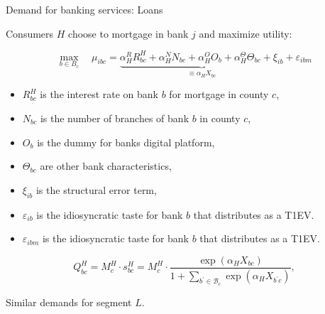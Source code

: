\documentclass[notes,10pt, aspectratio=169]{beamer}
\newenvironment{wideitemize}{\itemize\addtolength{\itemsep}{10pt}}{\enditemize}
\begin{document}
    \begin{frame}{ Demand for banking services: Loans}

        \begin{wideitemize}
    
            \item Consumers $H$ choose to mortgage in bank $j$  and maximize utility:
            
            $$
            \max _{b \in B_c} \quad \mu_{i b c}=\underbrace{\alpha_H^R R_{b c}^H+\alpha_H^N N_{b c}+\alpha_H^O O_b+\alpha_H^{\Theta} \Theta_{b c}+\xi_{i b}}_{\equiv \alpha_H X_{b c}}+\varepsilon_{i b m}
            $$
    
            \begin{itemize}
                \item $R_{b c}^H$ is the interest rate on bank $b$ for mortgage in county $c$,
                \item $N_{b c}$ is the number of branches of bank $b$ in county $c$,
                \item $O_b$ is the dummy for banks digital platform,
                \item $\Theta_{b c}$ are other bank characteristics,
                \item $\xi_{i b}$ is the structural error term,
                \item $\varepsilon_{i b}$ is the idiosyncratic taste for bank $b$ that distributes as a T1EV.
                \item $\varepsilon_{i b m}$ is the idiosyncratic taste for bank $b$ that distributes as a T1EV.
            \end{itemize}
    
         $$  Q_{b c}^H=M_c^H \cdot s_{b c}^H=M_c^H \cdot \frac{\exp \left(\alpha_H X_{b c}\right)}{1+\sum_{b^{\prime} \in \mathcal{B}_c} \exp \left(\alpha_H X_{b^{\prime} c}\right)},$$
    \item Similar demands for segment $L$.
        \end{wideitemize}
    
    
        \end{frame}


        

\end{document}
